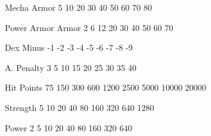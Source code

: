 \documentclass[twoside]{book}
\begin{document}
                      
                       Mecha Armor   
                       5   
                       10   
                       20   
                       30   
                       40   
                       50   
                       60   
                       70   
                       80   
                      
                      
                       Power Armor Armor   
                       2   
                       6   
                       12   
                       20   
                       30   
                       40   
                       50   
                       60   
                       70   
                      
                      
                       Dex Minus   
                       -1   
                       -2   
                       -3   
                       -4   
                       -5   
                       -6   
                       -7   
                       -8   
                       -9   
                      
                      
                       A. Penalty   
                       3   
                       5   
                       10   
                       15   
                       20   
                       25   
                       30   
                       35   
                       40   
                      
                      
                       Hit Points   
                       75   
                       150   
                       300   
                       600   
                       1200   
                       2500   
                       5000   
                       10000   
                       20000   
                      
                      
                       Strength   
                       5   
                       10   
                       20   
                       40   
                       80   
                       160   
                       320   
                       640   
                       1280   
                      
                      
                       Power   
                       2   
                       5   
                       10   
                       20   
                       40   
                       80   
                       160   
                       320   
                       640   
                      
\end{document}
